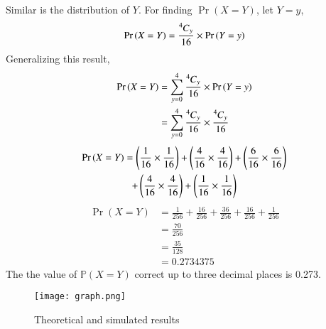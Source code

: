 \documentclass[journal,12pt,twocolumn]{IEEEtran}
\begin{document}
Similar is the distribution of $Y$. For finding $\Pr{(X=Y)}$, let $Y=y$,
\begin{align}
    \Pr{(X=Y)} = \frac{\comb[4]{y}}{16} \times \Pr{(Y=y)}
\end{align}
Generalizing this result,
\begin{align}
    \Pr{(X=Y)} &= \sum_{y=0}^4  \frac{\comb[4]{y}}{16}\times \Pr{(Y=y)}
    \\ &= \sum_{y=0}^4 \frac{\comb[4]{y}}{16} \times \frac{\comb[4]{y}}{16}
\end{align}
\begin{multline}
    \Pr{(X=Y)} = \brak{\frac{1}{16}\times\frac{1}{16}} + \brak{\frac{4}{16}\times\frac{4}{16}} +\brak{\frac{6}{16}\times\frac{6}{16}} \\+\brak{\frac{4}{16}\times\frac{4}{16}} +\brak{\frac{1}{16}\times\frac{1}{16}} 
\end{multline}
\begin{align}
    \Pr{(X=Y)} &= \frac{1}{256} + \frac{16}{256} +\frac{36}{256} +\frac{16}{256} +\frac{1}{256} 
    \\&= \frac{70}{256} 
    \\&= \frac{35}{128} 
    \\&= 0.2734375
\end{align}
The the value of $\mathbb{P}(X=Y)$ correct up to three decimal places is 0.273.
\begin{figure} [H]
    \texttt{[image: graph.png]}
    \caption{Theoretical and simulated results}
    \label{Fig 1}
\end{figure}
\end{document}
